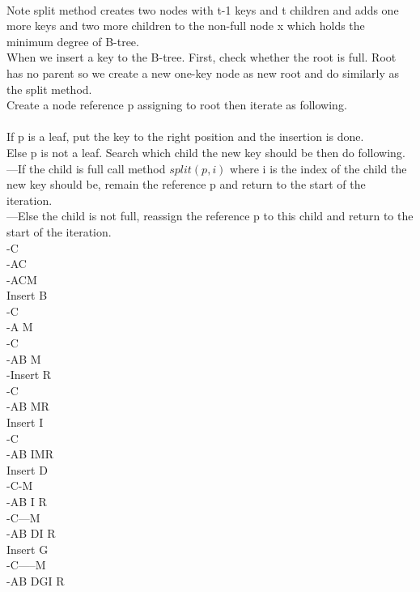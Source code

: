 \documentclass[10pt,twoside,a4paper]{article}
\begin{document}
\begin{itemize}
\\Note split method creates two nodes with t-1 keys and t children and adds one more keys and two more children to the non-full node x which holds the minimum degree of B-tree.
\\When we insert a key to the B-tree. First, check whether the root is full. Root has no parent so we create a new one-key node as new root and do similarly as the split method.
\\Create a node reference p assigning to root then iterate as following.
\\
\\If p is a leaf, put the key to the right position and the insertion is done.
\\Else p is not a leaf. Search which child the new key should be then do following.
\\---If the child is full call method $split(p,i)$ where i is the index of the child the new key should be, remain the reference p and return to the start of the iteration.
\\---Else the child is not full, reassign the reference p to this child and return to the start of the iteration.
\\-C
\\-AC
\\-ACM
\\Insert B
\\-\hspace{0.2cm}C
\\-A  M
\\-\hspace{0.4cm}C
\\-AB M
\\-Insert R
\\-\hspace{0.4cm}C
\\-AB MR
\\Insert I
\\-\hspace{0.4cm}C
\\-AB IMR
\\Insert D
\\-\hspace{0.4cm}C-M
\\-AB I R
\\-\hspace{0.4cm}C---M
\\-AB DI R
\\Insert G
\\-\hspace{0.4cm}C-----M
\\-AB  DGI  R

\end{itemize}
\end{document}
